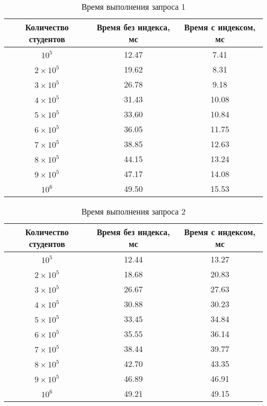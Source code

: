 \begin{table}[ht!]
	\begin{center}
		
		\caption{Время выполнения запроса 1}
		\label{tab:time}
		\begin{tabular}{|c|c|c|}
			\hline
			Количество студентов & Время без индекса, мс & Время с индексом, мс \\
			\hline
			$10^5$    & 12.47   & 7.41  \\
			\hline
			$2\times10^5$   & 19.62   &  8.31 \\
			\hline
			$3\times10^5$     & 26.78   & 9.18 \\
			\hline
			$4\times10^5$     & 31.43  &   10.08 \\
			\hline
			$5\times10^5$    & 33.60    & 10.84 \\
			\hline
			$6\times10^5$       & 36.05   & 11.75  \\
			\hline
			$7\times10^5$      & 38.85   &  12.63 \\
			\hline
			$8\times10^5$     & 44.15  &  13.24 \\
			\hline
			$9\times10^5$    & 47.17  & 14.08 \\
			\hline
			$10^6$     & 49.50 & 15.53 \\
			\hline
		\end{tabular}
	\end{center}
\end{table}

\begin{table}[ht!]
	\begin{center}
		
		\caption{Время выполнения запроса 2}
		\label{tab:time2}
		\begin{tabular}{|c|c|c|}
			\hline
			Количество студентов & Время без индекса, мс & Время с индексом, мс \\
			\hline
			$10^5$    & 12.44   & 13.27  \\
			\hline
			$2\times10^5$   & 18.68   &  20.83 \\
			\hline
			$3\times10^5$     & 26.67   & 27.63 \\
			\hline
			$4\times10^5$     & 30.88  &   30.23 \\
			\hline
			$5\times10^5$    & 33.45    & 34.84 \\
			\hline
			$6\times10^5$       & 35.55   & 36.14  \\
			\hline
			$7\times10^5$      & 38.44   &  39.77\\
			\hline
			$8\times10^5$     & 42.70  &  43.35 \\
			\hline
			$9\times10^5$    & 46.89  & 46.91 \\
			\hline
			$10^6$     & 49.21 & 49.15 \\
			\hline
		\end{tabular}
	\end{center}
\end{table}

